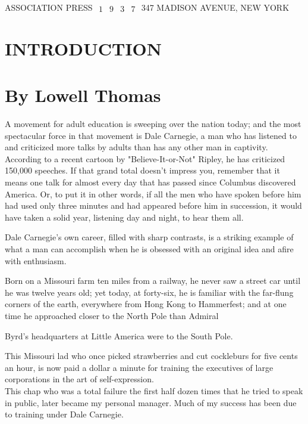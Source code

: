 \documentclass[10pt]{article}
\begin{document}
ASSOCIATION PRESS $\begin{array}{llll}1 & 9 & 3 & 7\end{array}$ 347 MADISON AVENUE, NEW YORK



\section*{INTRODUCTION}
\section*{By Lowell Thomas}
A movement for adult education is sweeping over the nation today; and the most spectacular force in that movement is Dale Carnegie, a man who has listened to and criticized more talks by adults than has any other man in captivity. According to a recent cartoon by "Believe-It-or-Not" Ripley, he has criticized 150,000 speeches. If that grand total doesn't impress you, remember that it means one talk for almost every day that has passed since Columbus discovered America. Or, to put it in other words, if all the men who have spoken before him had used only three minutes and had appeared before him in succession, it would have taken a solid year, listening day and night, to hear them all.

Dale Carnegie's own career, filled with sharp contrasts, is a striking example of what a man can accomplish when he is obsessed with an original idea and afire with enthusiasm.

Born on a Missouri farm ten miles from a railway, he never saw a street car until he was twelve years old; yet today, at forty-six, he is familiar with the far-flung corners of the earth, everywhere from Hong Kong to Hammerfest; and at one time he approached closer to the North Pole than Admiral

Byrd's headquarters at Little America were to the South Pole.

This Missouri lad who once picked strawberries and cut cockleburs for five cents an hour, is now paid a dollar a minute for training the executives of large corporations in the art of self-expression.\\
This chap who was a total failure the first half dozen times that he tried to speak in public, later became my personal manager. Much of my success has been due to training under Dale Carnegie.
\end{document}
